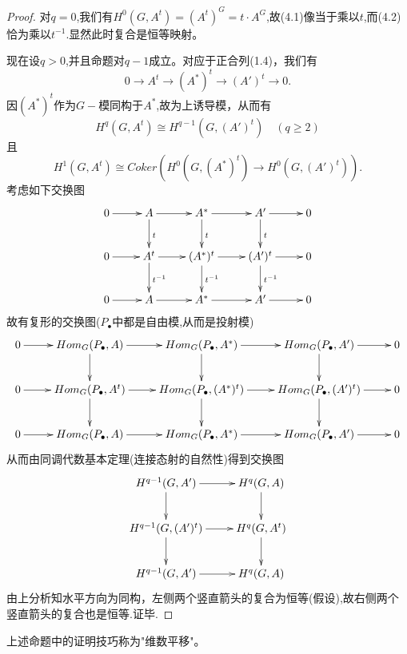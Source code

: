 \documentclass[UTF8]{article}
\begin{document}
\begin{proof}
对$q=0$,我们有$H^{0}(G,A^{t})=(A^{t})^{G}=t\cdot A^{G}$,故(4.1)像当于乘以$t$,而(4.2)恰为乘以$t^{-1}$.显然此时复合是恒等映射。

现在设$q>0$,并且命题对$q-1$成立。对应于正合列(1.4)，我们有
$$
0\rightarrow A^{t}\rightarrow (A^{*})^{t}\rightarrow (A')^{t}\rightarrow 0.
$$
因$(A^{*})^{t}$作为$G-$模同构于$A^{*}$,故为上诱导模，从而有
$$
H^{q}(G,A^{t})\cong H^{q-1}(G,(A')^{t})\quad (q\geq 2)
$$
且$$
H^{1}(G,A^{t})\cong Coker(H^{0}(G,(A^{*})^{t})\rightarrow H^{0}(G,(A')^{t})).
$$
考虑如下交换图
$$
\xymatrix{
0\ar[r]&A\ar[r]\ar[d]^{t}&A^{*}\ar[r]\ar[d]^{t}&A'\ar[r]\ar[d]^{t}&0\\
0\ar[r]&A^{t}\ar[r]\ar[d]^{t^{-1}}&(A^{*})^{t}\ar[r]\ar[d]^{t^{-1}}&(A')^{t}\ar[r]\ar[d]^{t^{-1}}&0\\
0\ar[r]&A\ar[r]&A^{*}\ar[r]&A'\ar[r]&0
}
$$
故有复形的交换图($P_{\bullet}$中都是自由模,从而是投射模)
$$
\xymatrix{
	0\ar[r]&Hom_{G}(P_{\bullet},A)\ar[r]\ar[d]&Hom_{G}(P_{\bullet},A^{*})\ar[r]\ar[d]&Hom_{G}(P_{\bullet},A')\ar[r]\ar[d]&0\\
	0\ar[r]&Hom_{G}(P_{\bullet},A^{t})\ar[r]\ar[d]&Hom_{G}(P_{\bullet},(A^{*})^{t})\ar[r]\ar[d]&Hom_{G}(P_{\bullet},(A')^{t})\ar[r]\ar[d]&0\\
	0\ar[r]&Hom_{G}(P_{\bullet},A)\ar[r]&Hom_{G}(P_{\bullet},A^{*})\ar[r]&Hom_{G}(P_{\bullet},A')\ar[r]&0
}
$$
从而由同调代数基本定理(连接态射的自然性)得到交换图
$$
\xymatrix{
H^{q-1}(G,A')\ar[r]\ar[d]&H^{q}(G,A)\ar[d]\\
H^{q-1}(G,(A')^{t})\ar[r]\ar[d]&H^{q}(G,A^{t})\ar[d]\\
H^{q-1}(G,A')\ar[r]&H^{q}(G,A)
}
$$
由上分析知水平方向为同构，左侧两个竖直箭头的复合为恒等(假设),故右侧两个竖直箭头的复合也是恒等.证毕.
\end{proof}
上述命题中的证明技巧称为"维数平移"。
\end{document}
